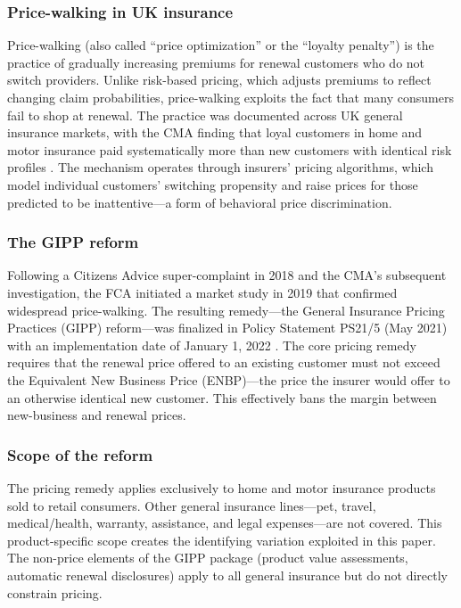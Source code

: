\documentclass[12pt]{article}
\begin{document}
\subsubsection*{Price-walking in UK insurance} Price-walking (also called ``price optimization'' or the ``loyalty penalty'') is the practice of gradually increasing premiums for renewal customers who do not switch providers. Unlike risk-based pricing, which adjusts premiums to reflect changing claim probabilities, price-walking exploits the fact that many consumers fail to shop at renewal. The practice was documented across UK general insurance markets, with the CMA finding that loyal customers in home and motor insurance paid systematically more than new customers with identical risk profiles \citep{cma2020loyalty}. The mechanism operates through insurers' pricing algorithms, which model individual customers' switching propensity and raise prices for those predicted to be inattentive---a form of behavioral price discrimination.

\subsubsection*{The GIPP reform} Following a Citizens Advice super-complaint in 2018 and the CMA's subsequent investigation, the FCA initiated a market study in 2019 that confirmed widespread price-walking. The resulting remedy---the General Insurance Pricing Practices (GIPP) reform---was finalized in Policy Statement PS21/5 (May 2021) with an implementation date of January 1, 2022 \citep{fca2021ps21}. The core pricing remedy requires that the renewal price offered to an existing customer must not exceed the Equivalent New Business Price (ENBP)---the price the insurer would offer to an otherwise identical new customer. This effectively bans the margin between new-business and renewal prices.

\subsubsection*{Scope of the reform} The pricing remedy applies exclusively to home and motor insurance products sold to retail consumers. Other general insurance lines---pet, travel, medical/health, warranty, assistance, and legal expenses---are not covered. This product-specific scope creates the identifying variation exploited in this paper. The non-price elements of the GIPP package (product value assessments, automatic renewal disclosures) apply to all general insurance but do not directly constrain pricing.
\end{document}
